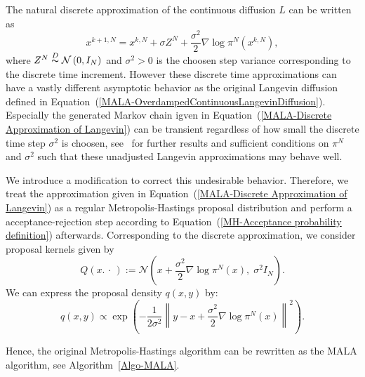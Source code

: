 The natural discrete approximation of the continuous diffusion $L$ can be written as
\begin{equation}
 \label{MALA-Discrete Approximation of Langevin}
 x^{k+1,N} = x^{k,N} + \sigma Z^N + \frac{\sigma^2}{2} \nabla \log \pi^{N} \left( x^{k,N} \right),  
\end{equation}
where $ Z^N \stackrel{D}{\thicksim} \mathcal{N}\left( 0, I_N \right) $ and $\sigma^2 > 0 $ is the choosen step variance corresponding to the discrete time increment. However these discrete time approximations can have a vastly different asymptotic behavior as the original Langevin diffusion defined in Equation~(\ref{MALA-OverdampedContinuousLangevinDiffusion}). Especially the generated Markov chain igven in Equation~(\ref{MALA-Discrete Approximation of Langevin}) can be transient regardless of how small the discrete time step $ \sigma^2 $ is choosen, see~\autocite[Theorem 3.2]{TweedieRoberts1996}  for further results and sufficient conditions on $ \pi^{N} $ and $ \sigma^2 $ such that these unadjusted Langevin approximations may behave well.

We introduce a modification to correct this undesirable behavior. Therefore, we treat the approximation given in Equation~(\ref{MALA-Discrete Approximation of Langevin}) as a regular Metropolis-Hastings proposal distribution and perform a acceptance-rejection step according to Equation~(\ref{MH-Acceptance probability definition}) afterwards. Corresponding to the discrete approximation, we consider proposal kernels given by
\begin{equation}
\label{MALA-GaussianProposalKernel}
 Q(x. \, \cdot \,) := \mathcal{N}(x + \frac{\sigma^2}{2} \nabla \log \pi^{N} \left( x \right),\; \sigma^2 I_{N} ).
\end{equation}
We can express the proposal density $ q(x,y) $ by:
\begin{equation}
\label{MALA - q(x,y)}
 q(x,y)  \varpropto  \exp{ \left( - \frac{ 1}{2 \sigma^2}  \left\| y - x + \frac{\sigma^2}{2} \nabla \log \pi^{N} \left( x \right) \right\|^2 \right) }.
\end{equation}

Hence, the original Metropolis-Hastings algorithm can be rewritten as the MALA algorithm, see Algorithm~\ref{Algo-MALA}.

